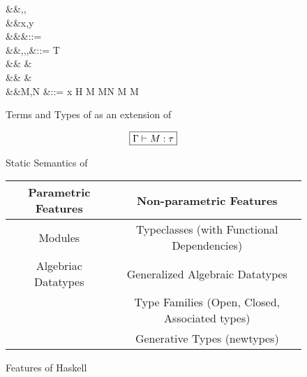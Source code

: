\documentclass[manuscript,screen,nonacm]{acmart}
\begin{document}
\begin{figure}[ht]
  \centering
  \begin{syntax}
     &&\alpha,\beta,\gamma \\
     &&x,y          \\
         &&\kappa                  &::= \star \mid \kappa \to \kappa \mid \syntaxhl{\tau \sim \sigma}\\
         &&\tau,\sigma,\gamma,\nu  &::= \alpha \mid T \mid {} \mid \tau \to \tau \mid \Forall {\alpha\co\kappa} \tau\\
    &&                        &\syntaxhl{\mid \sym \Co \mid \trans \nu \Co \mid \Co\At\tau \mid \left \Co \mid \right \Co} \\
    &&                        &\syntaxhl{\mid \leftc \Co \mid \rightc \Co \mid \Cast \Co \Co}\\
         &&M,N                     &::= x \mid H \mid {} M \mid M\App N \mid \TLam{\tau\co\kappa} M \mid M\App \tau
  \end{syntax}
  \caption{Terms and Types of \SFK as an extension of \SFC}
  \label{fig:system-fck-syntax}
\end{figure}


\begin{figure}[ht]
  \centering
  \begin{gather*}
    \fbox{$\Gamma \vdash M : \tau$}
  \end{gather*}
  \caption{Static Semantics of \SFK}
  \label{fig:sfk-typing}
\end{figure}


\begin{figure}[ht]
  \centering
  \begin{tabular}[ht]{c | c}
    Parametric Features & Non-parametric Features \\
    \hline
    Modules             & Typeclasses (with Functional Dependencies)\\
    Algebriac Datatypes & Generalized Algebraic Datatypes\\
                        & Type Families (Open, Closed, Associated types)\\
                        & Generative Types (newtypes)
  \end{tabular}
  \caption{Features of Haskell}
  \label{fig:haskell-lang-features}
\end{figure}
\end{document}
